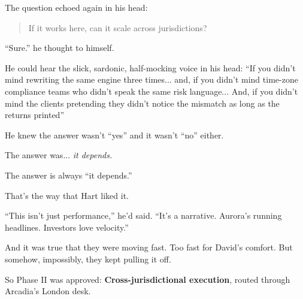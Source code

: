 \medskip


The question echoed again in his head:

\begin{quote}
    If it works here, can it scale across jurisdictions?
\end{quote}

``Sure.'' he thought to himself. 

He could hear the slick, sardonic, half-mocking voice in his head: ``If you didn’t mind rewriting 
the same engine three times... and,
if you didn’t mind time-zone compliance teams who didn’t speak the same risk language...
And, if you didn’t mind the clients pretending they didn’t notice the mismatch as long 
as the returns printed''

He knew the answer wasn’t ``yes'' and it wasn’t ``no'' either.

The answer was... 
\textit{it depends.}

The answer is always ``it depends.''

That's the way that Hart liked it.

``This isn’t just performance,'' he’d said. ``It’s a narrative. Aurora’s running headlines. Investors love 
velocity.''

And it was true that they were moving fast.
Too fast for David’s comfort.
But somehow, impossibly, they kept pulling it off.

So Phase II was approved:
\textbf{Cross-jurisdictional execution}, routed through Arcadia’s London desk.

\medskip

